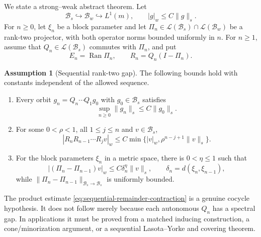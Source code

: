 \documentclass[11pt]{article}
\theoremstyle{definition}
\newtheorem{assumption}[theorem]{Assumption}
\theoremstyle{remark}
\newcommand{\cB}{\mathcal B}
\begin{document}
We state a strong--weak abstract theorem.  Let
\[
    \cB_s\hookrightarrow\cB_w\hookrightarrow L^1(m),
    \qquad |g|_w\le C\|g\|_s.
\]
For $n\ge0$, let $\xi_n$ be a block parameter and let $\Pi_n\in\mathcal L(\cB_s)\cap\mathcal L(\cB_w)$ be a rank-two projector, with both operator norms bounded uniformly in $n$.  For $n\ge1$, assume that $Q_n\in\mathcal L(\cB_s)$ commutes with $\Pi_n$, and put
\begin{equation}\label{eq:block-remainder}
    E_n=\operatorname{Ran}\Pi_n,
    \qquad
    R_n=Q_n(I-\Pi_n).
\end{equation}

\begin{assumption}[Sequential rank-two gap]\label{ass:rank-two-gap}
The following bounds hold with constants independent of the allowed sequence.

\begin{enumerate}[label=(B\arabic*)]
    \item Every orbit $g_n=Q_n\cdots Q_1g_0$ with $g_0\in\cB_s$ satisfies
    \[
        \sup_{n\ge0}\|g_n\|_s\le C\|g_0\|_s.
    \]

    \item For some $0<\rho<1$, all $1\le j\le n$ and $v\in\cB_s$,
    \begin{equation}\label{eq:sequential-remainder-contraction}
        |R_nR_{n-1}\cdots R_jv|_w
        \le C\min\bigl\{|v|_w,
                 \rho^{n-j+1}\|v\|_s\bigr\}.
    \end{equation}

    \item For the block parameters $\xi_n$ in a metric space, there is $0<\eta\le1$ such that
    \begin{equation}\label{eq:projector-holder}
        |(\Pi_n-\Pi_{n-1})v|_w
        \le C\delta_n^\eta\|v\|_s,
        \qquad
        \delta_n=d(\xi_n,\xi_{n-1}),
    \end{equation}
    while $\|\Pi_n-\Pi_{n-1}\|_{\cB_s\to\cB_s}$ is uniformly bounded.
\end{enumerate}
\end{assumption}

The product estimate \eqref{eq:sequential-remainder-contraction} is a genuine cocycle hypothesis.  It does not follow merely because each autonomous $Q_n$ has a spectral gap.  In applications it must be proved from a matched inducing construction, a cone/minorization argument, or a sequential Lasota--Yorke and covering theorem.
\end{document}
